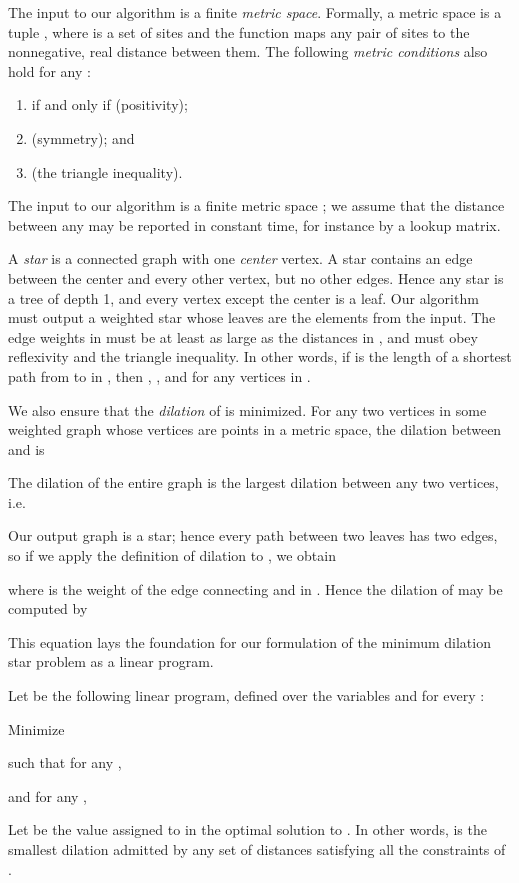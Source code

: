 \documentclass{llncs}
\begin{document}
The input to our algorithm is a finite \emph{metric space}.  Formally, a metric space  is a tuple , where  is a set of sites and the function  maps any pair of sites to the nonnegative, real distance between them.  The following \emph{metric conditions} also hold for any :
\begin{enumerate}
\item  if and only if  (positivity);
\item  (symmetry); and
\item  (the triangle inequality).
\end{enumerate}
\noindent The input to our algorithm is a finite metric space ; we assume that the distance  between any  may be reported in constant time, for instance by a lookup matrix.

A \emph{star} is a connected graph with one \emph{center} vertex.  A star contains an edge between the center and every other vertex, but no other edges.  Hence any star is a tree of depth 1, and every vertex except the center is a leaf.  Our algorithm must output a weighted star  whose leaves are the elements  from the input.  The edge weights in  must be at least as large as the distances in , and must obey reflexivity and the triangle inequality.  In other words, if  is the length of a shortest path from  to  in , then , , and  for any vertices  in .

We also ensure that the \emph{dilation} of  is minimized.  For any two vertices  in some weighted graph  whose vertices are points in a metric space, the dilation between  and  is

\noindent The dilation of the entire graph  is the largest dilation between any two vertices, i.e.

Our output graph  is a star; hence every path between two leaves has two edges, so if we apply the definition of dilation to , we obtain

\noindent where  is the weight of the edge connecting  and  in .  Hence the dilation of  may be computed by

\noindent This equation lays the foundation for our formulation of the minimum dilation star problem as a linear program.

\begin{definition}
\label{definition:L}
Let  be the following linear program, defined over the variables  and  for every :

\begin{center}
\noindent Minimize 
\end{center}
\noindent such that for any ,

\noindent and for any ,

\noindent Let  be the value assigned to  in the optimal solution to .  In other words,  is the smallest dilation admitted by any set of distances satisfying all the constraints of .
\end{definition}
\end{document}
